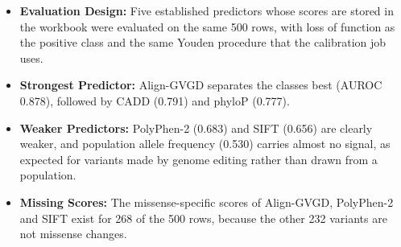 \begin{itemize}
\item \textbf{Evaluation Design:} Five established predictors whose scores are stored in the workbook were evaluated on the same 500 rows, with loss of function as the positive class and the same Youden procedure that the calibration job uses.
\item \textbf{Strongest Predictor:} Align-GVGD separates the classes best (AUROC 0.878), followed by CADD (0.791) and phyloP (0.777).
\item \textbf{Weaker Predictors:} PolyPhen-2 (0.683) and SIFT (0.656) are clearly weaker, and population allele frequency (0.530) carries almost no signal, as expected for variants made by genome editing rather than drawn from a population.
\item \textbf{Missing Scores:} The missense-specific scores of Align-GVGD, PolyPhen-2 and SIFT exist for 268 of the 500 rows, because the other 232 variants are not missense changes.
\end{itemize}

